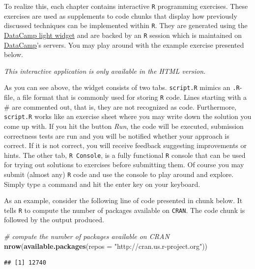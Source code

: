\documentclass[]{book}
\newenvironment{Shaded}{\begin{snugshade}}{\end{snugshade}}
\newcommand{\KeywordTok}[1]{\textcolor[rgb]{0.13,0.29,0.53}{\textbf{#1}}}
\newcommand{\DataTypeTok}[1]{\textcolor[rgb]{0.13,0.29,0.53}{#1}}
\newcommand{\StringTok}[1]{\textcolor[rgb]{0.31,0.60,0.02}{#1}}
\newcommand{\CommentTok}[1]{\textcolor[rgb]{0.56,0.35,0.01}{\textit{#1}}}
\newcommand{\NormalTok}[1]{#1}
\theoremstyle{definition}
\theoremstyle{definition}
\theoremstyle{definition}
\theoremstyle{remark}
\begin{document}
To realize this, each chapter contains interactive \texttt{R}
programming exercises. These exercises are used as supplements to code
chunks that display how previously discussed techniques can be
implemented within \texttt{R}. They are generated using the
\href{https://github.com/datacamp/datacamp-light}{DataCamp light widget}
and are backed by an \texttt{R} session which is maintained on
\href{https://www.datacamp.com/home}{DataCamp}'s servers. You may play
around with the example exercise presented below.

\begin{center}\textit{This interactive application is only available in the HTML version.}\end{center}

As you can see above, the widget consists of two tabs. \texttt{script.R}
mimics an \texttt{.R}-file, a file format that is commonly used for
storing \texttt{R} code. Lines starting with a \# are commented out,
that is, they are not recognized as code. Furthermore, \texttt{script.R}
works like an exercise sheet where you may write down the solution you
come up with. If you hit the button \emph{Run}, the code will be
executed, submission correctness tests are run and you will be notified
whether your approach is correct. If it is not correct, you will receive
feedback suggesting improvements or hints. The other tab,
\texttt{R Console}, is a fully functional \texttt{R} console that can be
used for trying out solutions to exercises before submitting them. Of
course you may submit (almost any) \texttt{R} code and use the console
to play around and explore. Simply type a command and hit the enter key
on your keyboard.

As an example, consider the following line of code presented in chunk
below. It tells \texttt{R} to compute the number of packages available
on \texttt{CRAN}. The code chunk is followed by the output produced.

\begin{Shaded}
\begin{Highlighting}[]
\CommentTok{# compute the number of packages available on CRAN}
\KeywordTok{nrow}\NormalTok{(}\KeywordTok{available.packages}\NormalTok{(}\DataTypeTok{repos =} \StringTok{"http://cran.us.r-project.org"}\NormalTok{))}
\end{Highlighting}
\end{Shaded}

\begin{verbatim}
## [1] 12740
\end{verbatim}
\end{document}
